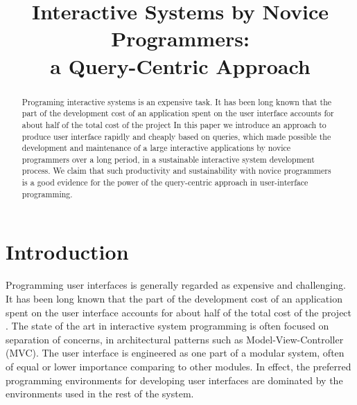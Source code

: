 \documentclass{chi2009}
\begin{document}
\title{Interactive Systems by Novice Programmers:\\ a %
Query-Centric Approach}


\maketitle
\begin{abstract}
Programing interactive systems is an expensive task. It has been long known that the part of the development cost of an application spent on the user interface accounts for 
about half
of the total cost of the project 
In this paper we introduce an approach to produce user interface rapidly and cheaply based on queries, which made possible the development and maintenance of a large interactive applications by novice programmers over a long period, in 
a sustainable interactive system development process. We claim that such productivity and sustainability with novice programmers is a good evidence for the power of the query-centric approach in user-interface programming. 
\end{abstract}

\section{Introduction}\label{sec:intro}
Programming user interfaces is generally regarded as expensive and challenging.  It has been long known that the part of the development cost of an application spent on the user interface accounts for about half of the total cost of the project \cite{Myers92surveyon}. The state of the art in interactive system programming is often focused on separation of concerns, in architectural patterns such as Model-View-Controller (MVC). The user interface is engineered as one part of a modular system, often of equal or lower importance comparing to other modules. In effect, the preferred programming environments for developing user interfaces are dominated by the environments used in the rest of the system.
\end{document}
